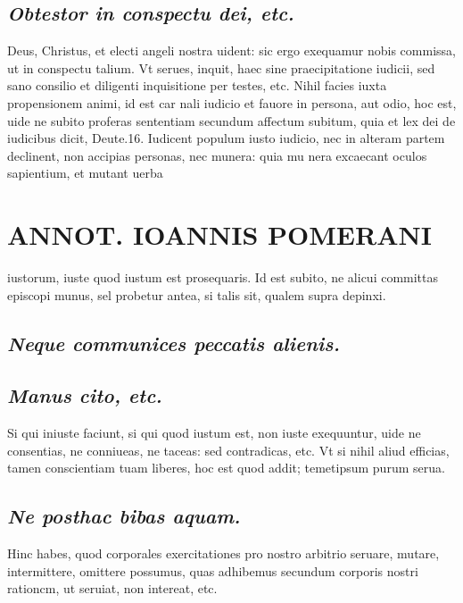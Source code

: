\documentclass{article}
\begin{document}
\begin{pages}
\subsection*{\textit{Obtestor in conspectu dei, etc. }}\pstart Deus, Christus, et electi angeli nostra uident: sic ergo exequamur nobis commissa, ut in conspectu talium. Vt serues, inquit, haec sine praecipitatione iudicii, sed sano consilio et diligenti inquisitione per testes, etc. Nihil facies iuxta propensionem animi, id est car nali iudicio et fauore in persona, aut odio, hoc est, uide ne subito proferas sententiam secundum affectum subitum, quia et lex dei de iudicibus dicit, Deute.16. Iudicent populum iusto iudicio, nec in alteram partem declinent, non accipias personas, nec munera: quia mu nera excaecant oculos sapientium, et mutant uerba  \pend
\section*{ANNOT. IOANNIS POMERANI }\pstart iustorum, iuste quod iustum est prosequaris.  \pend\pstart Id est subito, ne alicui committas episcopi munus, sel probetur antea, si talis sit, qualem supra depinxi.  \pend
{}
{}
\subsection*{\textit{Neque communices peccatis alienis. }}
{}
\subsection*{\textit{Manus cito, etc. }}\pstart Si qui iniuste faciunt, si qui quod iustum est, non iuste exequuntur, uide ne consentias, ne conniueas, ne taceas: sed contradicas, etc. Vt si nihil aliud efficias, tamen conscientiam tuam liberes, hoc est quod addit; temetipsum purum serua.  \pend
{}
{}
\subsection*{\textit{Ne posthac bibas aquam. }}\pstart Hinc habes, quod corporales exercitationes pro nostro arbitrio seruare, mutare, intermittere, omittere possumus, quas adhibemus secundum corporis nostri rationcm, ut seruiat, non intereat, etc.  \pend
{}
{}

\end{pages}
\end{document}
